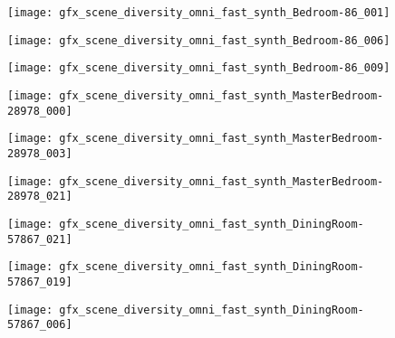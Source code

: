 \documentclass{article}
\begin{document}
\begin{figure}[t]
    \centering
    \hfill \begin{minipage}[b]{0.03\linewidth}
    \end{minipage}
    \begin{minipage}[b]{0.1\linewidth}
		\centering
		\texttt{[image: gfx\_scene\_diversity\_omni\_fast\_synth\_Bedroom-86\_001]}
    \end{minipage}\begin{minipage}[b]{0.1\linewidth}
		\centering
		\texttt{[image: gfx\_scene\_diversity\_omni\_fast\_synth\_Bedroom-86\_006]}
    \end{minipage}\begin{minipage}[b]{0.1\linewidth}
		\centering
		\texttt{[image: gfx\_scene\_diversity\_omni\_fast\_synth\_Bedroom-86\_009]}
    \end{minipage}\begin{minipage}[b]{0.1\linewidth}
		\centering
		\texttt{[image: gfx\_scene\_diversity\_omni\_fast\_synth\_MasterBedroom-28978\_000]}
    \end{minipage}\begin{minipage}[b]{0.1\linewidth}
		\centering
		\texttt{[image: gfx\_scene\_diversity\_omni\_fast\_synth\_MasterBedroom-28978\_003]}
    \end{minipage}\begin{minipage}[b]{0.1\linewidth}
		\centering
		\texttt{[image: gfx\_scene\_diversity\_omni\_fast\_synth\_MasterBedroom-28978\_021]}
    \end{minipage}\begin{minipage}[b]{0.1\linewidth}
		\centering
		\texttt{[image: gfx\_scene\_diversity\_omni\_fast\_synth\_DiningRoom-57867\_021]}
    \end{minipage}\begin{minipage}[b]{0.1\linewidth}
		\centering
		\texttt{[image: gfx\_scene\_diversity\_omni\_fast\_synth\_DiningRoom-57867\_019]}
    \end{minipage}\begin{minipage}[b]{0.1\linewidth}
		\centering
		\texttt{[image: gfx\_scene\_diversity\_omni\_fast\_synth\_DiningRoom-57867\_006]}
    \end{minipage}\hfill \vspace{-1.2em}

\end{figure}
\end{document}
